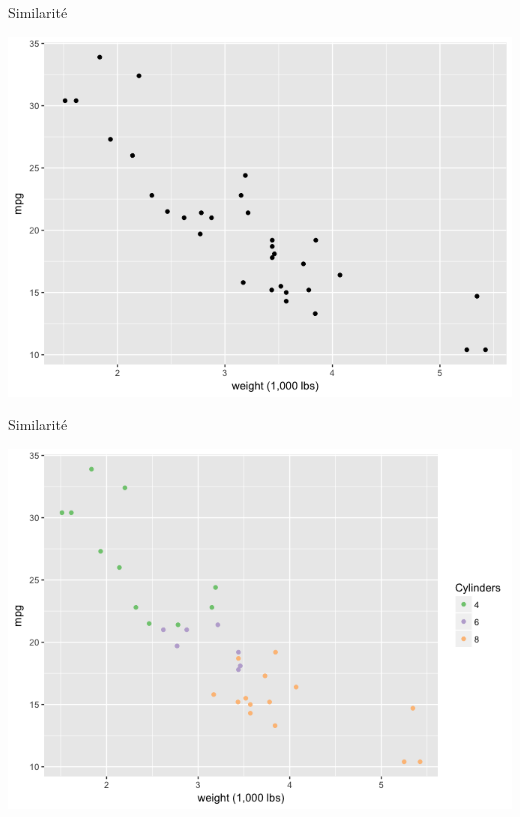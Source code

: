 \documentclass[french]{beamer}
\begin{document}
\begin{frame}{Similarité}
\begin{center}
	\includegraphics[height=0.8\textheight]{sim}
\end{center}
\end{frame}

\begin{frame}{Similarité}
\begin{center}
	\includegraphics[height=0.8\textheight]{sim2}
\end{center}
\end{frame}
\end{document}
